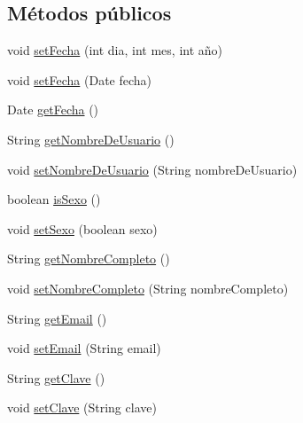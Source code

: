 \subsection*{Métodos públicos}
\begin{DoxyCompactItemize}
\item 
void \hyperlink{classcom_1_1ucab_1_1javachat_1_1_cliente_1_1model_1_1_usuario_a962413eaf8392fb0bbf4c258791c2f81}{set\-Fecha} (int dia, int mes, int año)
\item 
void \hyperlink{classcom_1_1ucab_1_1javachat_1_1_cliente_1_1model_1_1_usuario_a5f180af92da2cde84e9762a13f1dcedc}{set\-Fecha} (Date fecha)
\item 
Date \hyperlink{classcom_1_1ucab_1_1javachat_1_1_cliente_1_1model_1_1_usuario_ad255edbcac5585116c65773022df0f02}{get\-Fecha} ()
\item 
String \hyperlink{classcom_1_1ucab_1_1javachat_1_1_cliente_1_1model_1_1_usuario_a139d7d4ca4b1a37cb45b8ae6feaab09b}{get\-Nombre\-De\-Usuario} ()
\item 
void \hyperlink{classcom_1_1ucab_1_1javachat_1_1_cliente_1_1model_1_1_usuario_a7bc835c87e85911fd7532630bc526303}{set\-Nombre\-De\-Usuario} (String nombre\-De\-Usuario)
\item 
boolean \hyperlink{classcom_1_1ucab_1_1javachat_1_1_cliente_1_1model_1_1_usuario_a2a326a5856e7cd7bcb72b49850657bfd}{is\-Sexo} ()
\item 
void \hyperlink{classcom_1_1ucab_1_1javachat_1_1_cliente_1_1model_1_1_usuario_ad94a088891efdf5ff68fc768187d124a}{set\-Sexo} (boolean sexo)
\item 
String \hyperlink{classcom_1_1ucab_1_1javachat_1_1_cliente_1_1model_1_1_usuario_a56373f03d2014179ecbaec38601c9247}{get\-Nombre\-Completo} ()
\item 
void \hyperlink{classcom_1_1ucab_1_1javachat_1_1_cliente_1_1model_1_1_usuario_a558506188faab7a0293a175d40c5ce36}{set\-Nombre\-Completo} (String nombre\-Completo)
\item 
String \hyperlink{classcom_1_1ucab_1_1javachat_1_1_cliente_1_1model_1_1_usuario_ae2d27467fe4bc3dfe209dfec91394c91}{get\-Email} ()
\item 
void \hyperlink{classcom_1_1ucab_1_1javachat_1_1_cliente_1_1model_1_1_usuario_ab774a1a3508f87722db5aadceb062ad9}{set\-Email} (String email)
\item 
String \hyperlink{classcom_1_1ucab_1_1javachat_1_1_cliente_1_1model_1_1_usuario_ada00fd6555bb06d0bb5a726a5ebc1259}{get\-Clave} ()
\item 
void \hyperlink{classcom_1_1ucab_1_1javachat_1_1_cliente_1_1model_1_1_usuario_a0cdcb1ff20e55964e5af4177dadd89a8}{set\-Clave} (String clave)

\end{DoxyCompactItemize}
